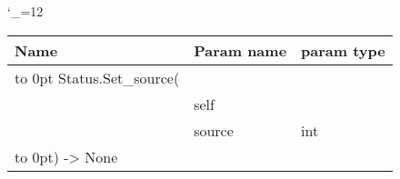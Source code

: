 \begingroup \catcode`\_=12 \tt
\begin{tabular}{lll}
\toprule
\textrm{Name}&\textrm{Param name}&\textrm{param type}\\
\midrule
\hbox to 0pt {Status.Set_source(\hss}\\
& self\\
& source & int\\
\hbox to 0pt{) -> None\hss}\\
\bottomrule
\end{tabular}
\endgroup
